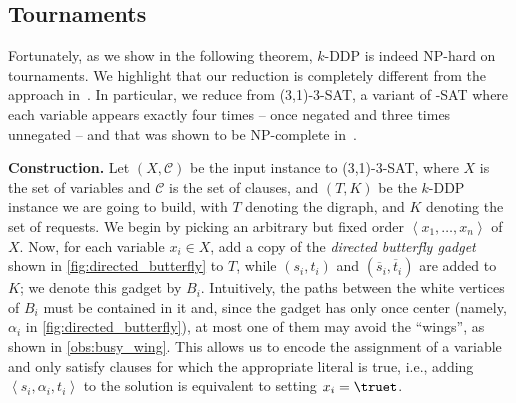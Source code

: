 \documentclass[a4paper,UKenglish,cleveref, autoref, thm-restate]{lipics-v2021}
\renewcommand{\NP}{{\sf NP}\xspace}
\newcommand{\angled}[1]{\left\langle{#1}\right\rangle}
\newcommand{\pname}[1]{{\sc #1}}
\newcommand{\ol}[1]{\overline{#1}}
\begin{document}
\subsection{Tournaments}
\label{sec:tournament_nph}
  Fortunately, as we show in the following theorem, \pname{$k$-DDP} is
  indeed \NP-hard on tournaments.
  We highlight that our reduction is completely different
  from the approach in~\cite{thomassen_tournament_nph}.
  In particular,
  we reduce from \pname{(3,1)-3-SAT}, a variant of \pname{3-SAT} where each variable appears
  exactly four times -- once negated and three times unnegated -- and that was shown to be
  \NP-complete in~\cite{darmann_monotone_sat}.

  \medskip

\noindent\textbf{Construction.} Let $(X, \mathcal{C})$ be   the input instance to
  \pname{(3,1)-3-SAT}, where $X$ is the set of variables and $\mathcal{C}$ is the set of clauses, and $(T, K)$ be the \pname{$k$-DDP} instance we are
  going to build, with $T$ denoting the digraph, and $K$ denoting the set of requests.
  We begin by picking an arbitrary but fixed order $\angled{x_1, \dots, x_n}$ of $X$.
  Now, for each variable $x_i \in X$, add a copy of the \textit{directed
  butterfly gadget} shown in \autoref{fig:directed_butterfly} to $T$, while $(s_i, t_i)$
  and $(\ol{s}_i, \ol{t}_i)$ are added to $K$; we denote this gadget by $B_i$.
  Intuitively, the paths between the white vertices of $B_i$ must be contained in it
  and, since the gadget has only once center (namely, $\alpha_i$ in
  \autoref{fig:directed_butterfly}), at most one of them may avoid the ``wings'', as shown in \autoref{obs:busy_wing}. This
  allows us to encode the assignment of a variable and only satisfy clauses for which the
  appropriate literal is true, i.e., adding $\angled{s_i, \alpha_i, t_i}$ to the solution is equivalent to setting $x_i = \truet$.
\end{document}
